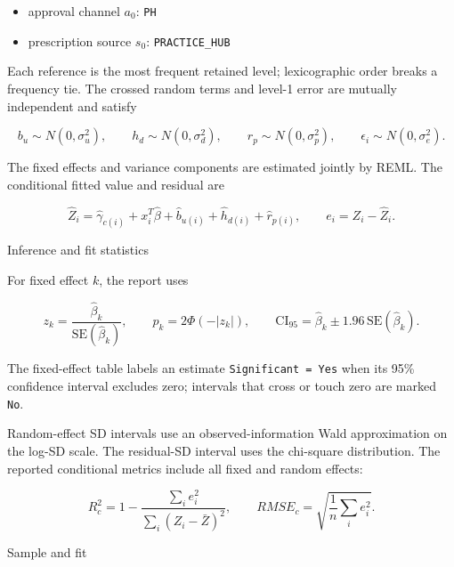 \documentclass[
]{article}
\providecommand{\tightlist}{%
  \setlength{\itemsep}{0pt}\setlength{\parskip}{0pt}}
\begin{document}
\begin{itemize}
\tightlist
\item
  approval channel \(a_0\): \texttt{PH}
\item
  prescription source \(s_0\): \texttt{PRACTICE\_HUB}
\end{itemize}

Each reference is the most frequent retained level; lexicographic order
breaks a frequency tie. The crossed random terms and level-1 error are
mutually independent and satisfy

\[
b_u\sim N(0,\sigma_u^2),\qquad
h_d\sim N(0,\sigma_d^2),\qquad
r_p\sim N(0,\sigma_p^2),\qquad
\epsilon_i\sim N(0,\sigma_e^2).
\]

The fixed effects and variance components are estimated jointly by REML.
The conditional fitted value and residual are

\[
\widehat{Z}_i=\widehat{\gamma}_{c(i)}+x_i^T\widehat{\beta}
+\widehat{b}_{u(i)}+\widehat{h}_{d(i)}+\widehat{r}_{p(i)},
\qquad e_i=Z_i-\widehat{Z}_i.
\]

Inference and fit statistics

For fixed effect \(k\), the report uses

\[
z_k=\frac{\widehat{\beta}_k}{\mathrm{SE}(\widehat{\beta}_k)},\qquad
p_k=2\Phi(-\lvert z_k\rvert),\qquad
\mathrm{CI}_{95}=\widehat{\beta}_k\pm1.96\,\mathrm{SE}(\widehat{\beta}_k).
\]

The fixed-effect table labels an estimate \texttt{Significant\ =\ Yes}
when its 95\% confidence interval excludes zero; intervals that cross or
touch zero are marked \texttt{No}.

Random-effect SD intervals use an observed-information Wald
approximation on the log-SD scale. The residual-SD interval uses the
chi-square distribution. The reported conditional metrics include all
fixed and random effects:

\[
R_c^2=1-\frac{\sum_i e_i^2}{\sum_i(Z_i-\bar Z)^2},\qquad
RMSE_c=\sqrt{\frac1n\sum_i e_i^2}.
\]

Sample and fit
\end{document}
